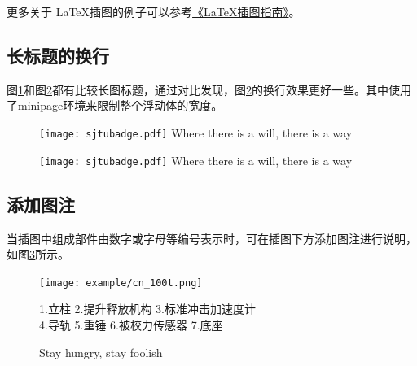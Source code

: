 更多关于 \LaTeX 插图的例子可以参考\href{http://www.cs.duke.edu/junhu/Graphics3.pdf}{《\LaTeX 插图指南》}。

\subsection{长标题的换行}
\label{sec:longcaption}

图\ref{fig:longcaptionbad}和图\ref{fig:longcaptiongood}都有比较长图标题，通过对比发现，图\ref{fig:longcaptiongood}的换行效果更好一些。其中使用了minipage环境来限制整个浮动体的宽度。

\begin{figure}[!htp]
  \centering
  \texttt{[image: sjtubadge.pdf]}
    {Where there is a will, there is a way}
 \label{fig:longcaptionbad}
\end{figure}

\begin{figure}[!htbp]
  \centering
  \begin{minipage}[b]{0.6\textwidth}
    \centering
    \texttt{[image: sjtubadge.pdf]}
      {Where there is a will, there is a way}
    \label{fig:longcaptiongood}
  \end{minipage}
\end{figure}

\subsection{添加图注}

当插图中组成部件由数字或字母等编号表示时，可在插图下方添加图注进行说明，如图\ref{fig:cn_100t}所示。

\begin{figure}[!htp]
  \centering
  \texttt{[image: example/cn\_100t.png]}\
  \begin{center}
    \small\kaishu 1.立柱 2.提升释放机构 3.标准冲击加速度计 \\ 4.导轨 5.重锤 6.被校力传感器 7.底座
  \end{center}
  \vspace{0.3em}
    {Stay hungry, stay foolish}
 \label{fig:cn_100t}
\end{figure}

